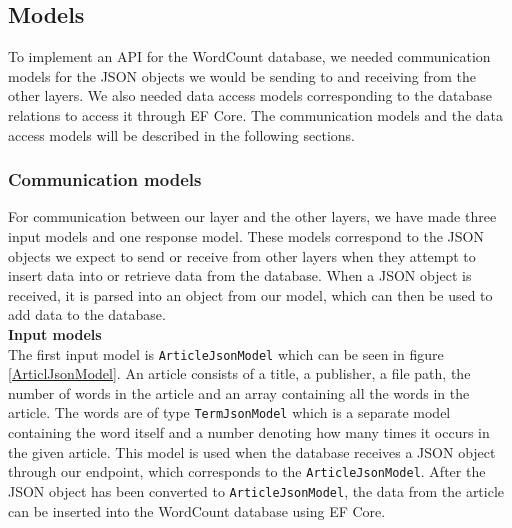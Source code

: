 \subsection{Models}\label{models}
To implement an API for the WordCount database, we needed communication models for the JSON objects we would be sending to and receiving from the other layers. 
We also needed data access models corresponding to the database relations to access it through EF Core. 
The communication models and the data access models will be described in the following sections.

\subsubsection*{Communication models}
For communication between our layer and the other layers, we have made three input models and one response model. 
These models correspond to the JSON objects we expect to send or receive from other layers when they attempt to insert data into or retrieve data from the database. 
When a JSON object is received, it is parsed into an object from our model, which can then be used to add data to the database.
\\

\textbf{Input models}\\
The first input model is \texttt{ArticleJsonModel} which can be seen in figure \ref{ArticlJsonModel}. An article consists of a title, a publisher, a file path, the number of words in the article and an array containing all the words in the article. 
The words are of type \texttt{TermJsonModel} which is a separate model containing the word itself and a number denoting how many times it occurs in the given article.
This model is used when the database receives a JSON object through our endpoint, which corresponds to the \texttt{ArticleJsonModel}. 
After the JSON object has been converted to \texttt{ArticleJsonModel}, the data from the article can be inserted into the WordCount database using EF Core.

